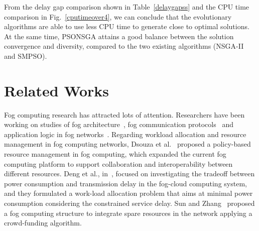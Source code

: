 \documentclass[10pt,journal,compsoc]{IEEEtran}
\newcommand{\Fig}[1]{Fig.~\ref{#1}}
\begin{document}
From the delay gap comparison shown in Table~\ref{delaygapss} and the CPU time comparison in \Fig{cputimeover4}, we can conclude that the evolutionary algorithms are able to use less CPU time to generate close to optimal solutions. At the same time, PSONSGA attains a good balance between the solution convergence and diversity, compared to the two existing algorithms (NSGA-II and SMPSO).


\section{Related Works}\label{relwork}
Fog computing research has attracted lots of attention. Researchers have been working on studies of fog architecture~\cite{fcsmartcity}, fog communication protocols~\cite{Peng:2016:FRA:3029494.3029575} and application logic in fog networks~\cite{SUN2017687}. Regarding workload allocation and resource management in fog computing networks, Dsouza et al.~\cite{secme} proposed a policy-based resource management in fog computing, which expanded the current fog computing platform to support collaboration and interoperability between different resources. Deng et al., in~\cite{fcworkload}, focused on investigating the tradeoff between power consumption and transmission delay in the fog-cloud computing system, and they formulated a work-load allocation problem that aims at minimal power consumption considering the constrained service delay. Sun and Zhang~\cite{SUN2017687} proposed a fog computing structure to integrate spare resources in the network applying a crowd-funding algorithm.
\end{document}
